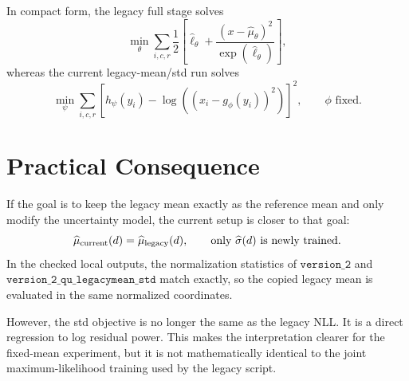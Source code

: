 \documentclass[11pt]{article}
\newcommand{\mean}{\mu}
\newcommand{\logvar}{\ell}
\newcommand{\std}{\sigma}
\newcommand{\pix}{r}
\newcommand{\chan}{c}
\begin{document}
In compact form, the legacy full stage solves
\[
  \min_{\theta}
  \sum_{i,\chan,\pix}
  \frac{1}{2}
  \left[
    \widehat{\logvar}_{\theta}
    +
    \frac{
      (x-\widehat{\mean}_{\theta})^2
    }{
      \exp(\widehat{\logvar}_{\theta})
    }
  \right],
\]
whereas the current legacy-mean/std run solves
\[
  \min_{\psi}
  \sum_{i,\chan,\pix}
  \left[
    h_\psi(y_i)
    -
    \log
    \left(
      (x_i-g_\phi(y_i))^2
    \right)
  \right]^2,
  \qquad
  \phi \text{ fixed}.
\]

\section{Practical Consequence}

If the goal is to keep the legacy mean exactly as the reference mean and only
modify the uncertainty model, the current setup is closer to that goal:
\[
  \widehat{\mean}_{\rm current}(d)
  =
  \widehat{\mean}_{\rm legacy}(d),
  \qquad
  \text{only } \widehat{\std}(d) \text{ is newly trained}.
\]
In the checked local outputs, the normalization statistics of
\(\texttt{version\_2}\) and
\(\texttt{version\_2\_qu\_legacymean\_std}\) match exactly, so the copied
legacy mean is evaluated in the same normalized coordinates.

However, the std objective is no longer the same as the legacy NLL.  It is a
direct regression to log residual power.  This makes the interpretation clearer
for the fixed-mean experiment, but it is not mathematically identical to the
joint maximum-likelihood training used by the legacy script.
\end{document}
